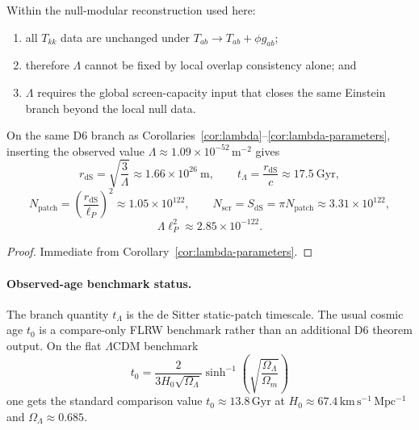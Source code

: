 \begin{theorem}
Within the null-modular reconstruction used here:
\begin{enumerate}[leftmargin=2em]
\item all \(T_{kk}\) data are unchanged under \(T_{ab}\to T_{ab}+\phi g_{ab}\);
\item therefore \(\Lambda\) cannot be fixed by local overlap consistency alone; and
\item \(\Lambda\) requires the global screen-capacity input that closes the same Einstein branch beyond the local null data.
\end{enumerate}
\end{theorem}

\begin{corollary}\label{cor:lambda-benchmark}
On the same D6 branch as Corollaries~\ref{cor:lambda}--\ref{cor:lambda-parameters}, inserting the observed value \(\Lambda\approx 1.09\times 10^{-52}\,\mathrm{m^{-2}}\) gives
\[
r_{\mathrm{dS}}=\sqrt{\frac{3}{\Lambda}}\approx 1.66\times 10^{26}\ \mathrm{m},
\qquad
t_\Lambda=\frac{r_{\mathrm{dS}}}{c}\approx 17.5\ \mathrm{Gyr},
\]
\[
N_{\mathrm{patch}}=\left(\frac{r_{\mathrm{dS}}}{\ell_P}\right)^2
\approx 1.05\times 10^{122},
\qquad
N_{\mathrm{scr}}=S_{\mathrm{dS}}=\pi N_{\mathrm{patch}}
\approx 3.31\times 10^{122},
\]
\[
\Lambda\ell_P^2\approx 2.85\times10^{-122}.
\]
\end{corollary}

\begin{proof}
Immediate from Corollary~\ref{cor:lambda-parameters}.
\end{proof}

\paragraph{Observed-age benchmark status.}
The branch quantity \(t_\Lambda\) is the de Sitter static-patch timescale. The usual cosmic age \(t_0\) is a compare-only FLRW benchmark rather than an additional D6 theorem output. On the flat \(\Lambda\)CDM benchmark
\[
t_0=\frac{2}{3H_0\sqrt{\Omega_\Lambda}}
\sinh^{-1}\!\left(\sqrt{\frac{\Omega_\Lambda}{\Omega_m}}\right)
\]
one gets the standard comparison value \(t_0\approx 13.8\,\mathrm{Gyr}\) at
\(H_0\approx 67.4\,\mathrm{km\,s^{-1}\,Mpc^{-1}}\) and \(\Omega_\Lambda\approx 0.685\).


